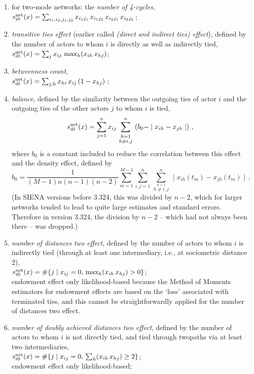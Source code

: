 \documentclass[a4paper,fleqn]{article}
\newcommand{\+}{\, + \,}
\newcommand{\neqsum}[3]
{\, \sum_{\stackrel{\scriptstyle #1 = 1}{\scriptstyle #2 \neq #3}}^n \,}
\newcommand{\vit}{\theenumi}
\newcommand{\SI}{{\sf SIENA }}
\begin{document}
{\begin{enumerate}
 \item for two-mode networks: the {\em number of 4-cycles},\\
 $s^{\rm net}_{i\vit}(x) =  \sum_{i_1, i_2, j_1, j_2}
            x_{i_1 j_1}\, x_{i_1 j_2}\, x_{i_2 j_1}\, x_{i_2 j_2}\,$;


 \item {\em transitive ties effect} (earlier called \emph{(direct and indirect ties) effect}),
 defined by
 the number of actors to whom $i$ is directly as well as indirectly tied,\\
 $s^{\rm net}_{i\vit}(x) =  \sum_j x_{ij} \, \max_h (x_{ih}\, x_{hj}) $;

 \item {\em betweenness count},\\
 $s^{\rm net}_{i\vit}(x) =  \sum_{j, h} x_{hi}\, x_{ij}\, (1-x_{hj})\,$;

 \item {\em balance}, defined by the similarity between the outgoing ties
 of actor $i$ and the outgoing ties of the other actors $j$ to whom
 $i$ is tied,
 \[ s^{\rm net}_{i\vit}(x) = \sum_{j=1}^n x_{ij} \neqsum{h}{h}{i,j}
 \left( b_0 - \mid x_{ih} - x_{jh} \mid \right)\, , \]
 where $b_0$ is a constant included to reduce the correlation
 between this effect and the density effect,
 \hypertarget{T_meanbal}{defined by}
 \[ b_0 = \frac{1}{(M-1)n(n-1)(n-2)} \sum_{m=1}^{M-1}
 \sum_{i, j=1}^n \neqsum{h}{h}{i,j}
 \mid x_{ih}(t_m) - x_{jh}(t_m) \mid \,.\]
 (In \SI versions before 3.324, this was divided by $n-2$, which for larger networks
 tended to lead to quite large estimates and standard errors.
 Therefore in version 3.324, the division by $n-2$
 -- which had not always been there -- was dropped.)

 \item {\em number of distances two effect},
 \hypertarget{T_dist2}{defined by}
 the number of actors to whom $i$ is indirectly tied
 (through at least one intermediary, i.e., at sociometric distance 2),\\
 $s^{\rm net}_{i\vit}(x) =  \#\{j \mid x_{ij} = 0,\, \max_h (x_{ih}\, x_{hj}) > 0 \}$;\\
 endowment effect only likelihood-based because the Method of Moments
 estimators for endowment effects are based on the `loss' associated
 with terminated ties, and this cannot be straightforwardly applied
 for the number of distances two effect.

 \item {\em number of doubly achieved distances two effect},
 defined by
 the number of actors to whom $i$
 is not directly tied, and tied through twopaths via at least two intermediaries,\\
 $s^{\rm net}_{i\vit}(x) =  \#\{j \mid x_{ij} = 0,\, \sum_h (x_{ih}\, x_{hj}) \geq 2 \}$;\\
 endowment effect only likelihood-based;



\end{enumerate}}
\end{document}
